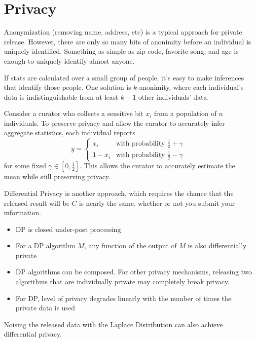 \section{Privacy}

Anonymization (removing name, address, etc) is a typical
approach for private release. However, there are only
so many bits of anonimity before an individual is uniquely
identified. Something as simple as zip code, favorite
song, and age is enough to uniquely identify almost
anyone.

If stats are calculated over a small group of people,
it's easy to make inferences that identify those
people. One solution is $k$-anonimity, where each
individual's data is indistinguishable from at least
$k - 1$ other individuals' data.

Consider a curator who collects a sensitive bit $x_i$ from a
population of $n$ individuals.
To preserve privacy and allow the curator to accurately
infer aggregate statistics, each individual reports
\begin{equation}
    y =
    \begin{cases}
        x_i     & \text{with probability } \frac{1}{2} + \gamma \\
        1 - x_i & \text{with probability } \frac{1}{2} - \gamma
    \end{cases}
\end{equation}
for some fixed $\gamma \in [0, \frac{1}{2}]$.
This allows the curator to accurately estimate the mean
while still preserving privacy.

Differential Privacy is another approach, which requires
the chance that the released result will be $C$ is nearly
the same, whether or not you submit your information.

\begin{itemize}
    \item DP is closed under-post processing
    \item For a DP algorithm $M$, any function of the output of $M$
          is also differentially private
    \item DP algorithms can be composed. For other privacy mechanisms,
          releasing two algorithms that are individually
          private may completely break privacy.
    \item For DP, level of privacy degrades linearly with the number of times the private
          data is used
\end{itemize}

Noising the released data with the Laplace Distribution can also 
achieve differential privacy. 